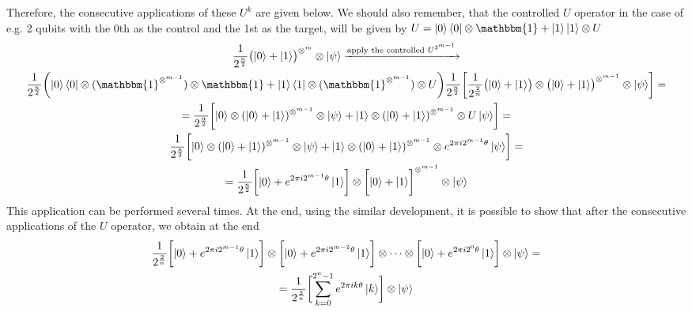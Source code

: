 Therefore, the consecutive applications of these $U^{k}$ are given below. We should also remember, that the controlled $U$ operator in the case of e.g. 2 qubits with 
the 0th as the control and the 1st as the target, will be given by $U = \ket{0}\bra{0}\otimes \mathbbm{1} + \ket{1}\ket{1}\otimes U$
\begin{gather}
  \frac{1}{2^{\frac{n}{2}}} \bigl (\ket{0} + \ket{1} \bigr)^{\otimes^{m}}\otimes \ket{\psi} \xrightarrow{\text{apply the controlled }U^{2^{m-1}}} \\
  \frac{1}{2^{\frac{n}{2}}}\biggl(\ket{0}\bra{0}\otimes (\mathbbm{1}^{\otimes^{m-1}}) \otimes \mathbbm{1} + \ket{1}\bra{1}\otimes (\mathbbm{1}^{\otimes^{m-1}}) \otimes U \biggr) 
  \frac{1}{2^{\frac{n}{2}}}\biggl[\frac{1}{2^{\frac{2}{n}}}\bigl (\ket{0} + \ket{1} \bigr)\otimes \bigl (\ket{0} + \ket{1} \bigr)^{\otimes^{m-1}}\otimes \ket{\psi} \biggr]= \\
  = \frac{1}{2^{\frac{n}{2}}}\biggl[ \ket{0}\otimes (\ket{0}+\ket{1})^{\otimes^{m-1}} \otimes \ket{\psi} + \ket{1}\otimes (\ket{0}+\ket{1})^{\otimes^{m-1}}\otimes U\ket{\psi} \biggr] = \\
  \frac{1}{2^{\frac{n}{2}}}\biggl[ \ket{0}\otimes (\ket{0}+\ket{1})^{\otimes^{m-1}} \otimes \ket{\psi} + \ket{1}\otimes (\ket{0}+\ket{1})^{\otimes^{m-1}}\otimes e^{2\pi i2^{m-1}\theta}\ket{\psi} \biggr] = \\
  = \frac{1}{2^{\frac{n}{2}}}\biggl[ \ket{0} + e^{2\pi i2^{m-1}\theta}\ket{1} \biggr] \otimes \biggl[ \ket{0}+\ket{1} \biggr]^{\otimes^{m-1}}\otimes \ket{\psi}
\end{gather}
This application can be performed several times. At the end, using the similar development, it is possible to 
show that after the consecutive applications of the $U$ operator, we obtain at the end 
\begin{gather}
  \frac{1}{2^{\frac{2}{n}}} \biggl[ \ket{0} + e^{2\pi i2^{m-1}\theta}\ket{1}  \biggr] \otimes \biggl[  \ket{0} + e^{2\pi i2^{m-2}\theta}\ket{1} \biggr] \otimes 
  \cdots \otimes \biggl[  \ket{0} + e^{2\pi i2^{0}\theta}\ket{1} \biggr] \otimes \ket{\psi} = \\
  = \frac{1}{2^{\frac{2}{n}}}\biggl[ \sum_{k=0}^{2^n-1} e^{2\pi i k \theta} \ket{k} \biggr]\otimes \ket{\psi}
\end{gather}

